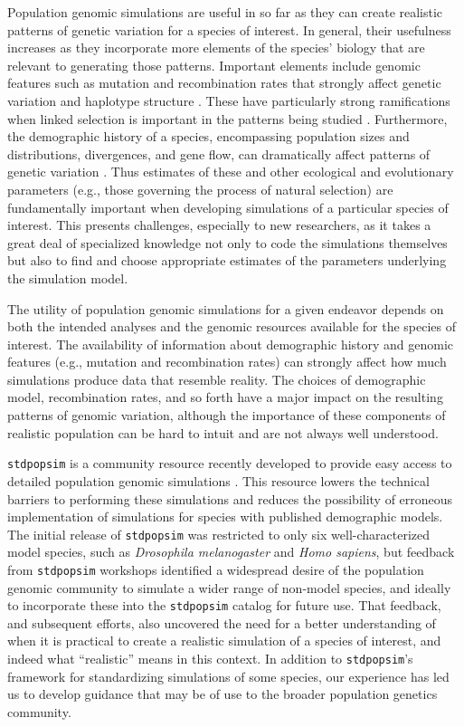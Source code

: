 \documentclass[hidelinks]{article}
\newcommand{\stdpopsim}{\texttt{stdpopsim}\xspace}
\begin{document}
Population genomic simulations are useful in so far as they can
create realistic patterns of genetic variation for a species of interest.
In general, their usefulness increases 
as they incorporate more elements of the species' biology that are
relevant to generating those patterns. Important
elements include genomic features such as mutation and recombination
rates that strongly affect genetic variation and haplotype structure
\citep{Nachman2002}. These have particularly strong ramifications 
when linked selection is important in the patterns being studied \citep{Cutter2013}.
Furthermore, the demographic history of a species,
encompassing population sizes and distributions, divergences, and gene flow, can
dramatically affect patterns of genetic variation \citep{Teshima2006}. Thus
estimates of these and other ecological and evolutionary parameters (e.g., those governing
the process of natural selection) are fundamentally important when
developing simulations of a particular species of interest.
This presents challenges, especially to new researchers,
as it takes a great deal of specialized knowledge not only to code the simulations themselves
but also to find and choose appropriate estimates of the parameters underlying the simulation model.

The utility of population genomic simulations for a given endeavor
depends on both the intended analyses
and the genomic resources available for the species of interest.
The availability of information about demographic history and genomic features
(e.g., mutation and recombination rates)
can strongly affect how much simulations produce data that resemble reality.
The choices of demographic model, recombination rates, and so forth
have a major impact on the resulting patterns of genomic variation,
although the importance of these components of realistic population
can be hard to intuit and are not always well understood.

\stdpopsim is a community resource recently developed to provide easy
access to detailed population genomic simulations \citep{Adrion2020}. This
resource lowers the technical barriers to performing these simulations
and reduces the possibility of erroneous implementation of simulations
for species with published demographic models. 
The initial release of \stdpopsim was
restricted to only six well-characterized model species, such as
\emph{Drosophila melanogaster} and \emph{Homo sapiens},
but feedback from \stdpopsim workshops identified a widespread desire
of the population genomic community to simulate
a wider range of non-model species,
and ideally to incorporate these into the \stdpopsim catalog for future use.
That feedback, and subsequent efforts, also uncovered the need for a 
better understanding of when it is practical to create a realistic
simulation of a species of interest, and indeed what ``realistic'' means in this context.
In addition to \stdpopsim's framework for standardizing simulations of some species,
our experience has led us to develop guidance that may be of use to
the broader population genetics community.
\end{document}

